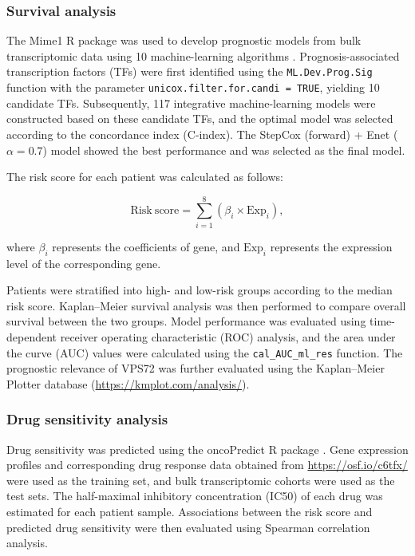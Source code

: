 \documentclass[pdflatex,sn-mathphys-num]{sn-jnl}%
\theoremstyle{thmstyleone}%
\theoremstyle{thmstyletwo}%
\theoremstyle{thmstylethree}%
\begin{document}
\subsubsection{Survival analysis}\label{subsubsec_survival}

The Mime1 R package was used to develop prognostic models from bulk transcriptomic data using 10 machine-learning algorithms \cite{bib45}. Prognosis-associated transcription factors (TFs) were first identified using the \texttt{ML.Dev.Prog.Sig} function with the parameter \texttt{unicox.filter.for.candi = TRUE}, yielding 10 candidate TFs. Subsequently, 117 integrative machine-learning models were constructed based on these candidate TFs, and the optimal model was selected according to the concordance index (C-index). The StepCox (forward) + Enet (\(\alpha = 0.7\)) model showed the best performance and was selected as the final model.

The risk score for each patient was calculated as follows:

\begin{equation}
\mathrm{Risk\ score} = \sum_{i=1}^{8}
\left( \beta_i \times \mathrm{Exp}_i \right),
\end{equation}

where \(\beta_i\) represents the coefficients of gene, and \(\mathrm{Exp}_i\) represents the expression level of the corresponding gene.

Patients were stratified into high- and low-risk groups according to the median risk score. Kaplan--Meier survival analysis was then performed to compare overall survival between the two groups. Model performance was evaluated using time-dependent receiver operating characteristic (ROC) analysis, and the area under the curve (AUC) values were calculated using the \texttt{cal\_AUC\_ml\_res} function. The prognostic relevance of VPS72 was further evaluated using the Kaplan--Meier Plotter database (\url{https://kmplot.com/analysis/}).

\subsubsection{Drug sensitivity analysis}\label{subsubsec_drug_sensitivity}

Drug sensitivity was predicted using the oncoPredict R package \cite{bib46}. Gene expression profiles and corresponding drug response data obtained from \url{https://osf.io/c6tfx/} were used as the training set, and bulk transcriptomic cohorts were used as the test sets. The half-maximal inhibitory concentration (IC50) of each drug was estimated for each patient sample. Associations between the risk score and predicted drug sensitivity were then evaluated using Spearman correlation analysis.
\end{document}
